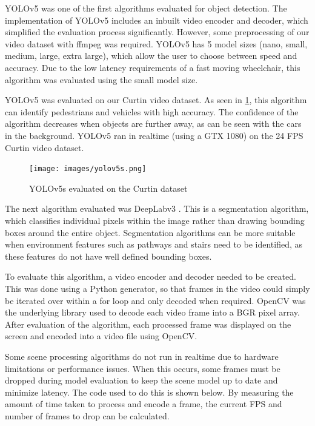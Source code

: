 \documentclass[12pt]{article}
\begin{document}
YOLOv5 \cite{ultralyticsYOLOv5} was one of the first algorithms evaluated for object detection.
The implementation of YOLOv5 includes an inbuilt video encoder and decoder, which simplified
the evaluation process significantly. However, some preprocessing of our video dataset with ffmpeg was required.
YOLOv5 has 5 model sizes (nano, small, medium, large, extra large),
which allow the user to choose between speed and accuracy.
Due to the low latency requirements of a fast moving wheelchair, this algorithm was evaluated using the small model size.

YOLOv5 was evaluated on our Curtin video dataset. As seen in \cref{fig:yolov5s}, this algorithm can identify pedestrians and vehicles with high accuracy.
The confidence of the algorithm decreases when objects are further away, as can be seen with the cars in the background.
YOLOv5 ran in realtime (using a GTX 1080) on the 24 FPS Curtin video dataset.

\begin{figure}[bp]
    \centering
    \texttt{[image: images/yolov5s.png]}
    \caption{YOLOv5s evaluated on the Curtin dataset}
    \label{fig:yolov5s}
\end{figure}

The next algorithm evaluated was DeepLabv3 \cite{chenRethinkingAtrousConvolution2017}. This is a segmentation algorithm,
which classifies individual pixels within the image rather than drawing bounding boxes around the entire object.
Segmentation algorithms can be more suitable when environment features such as pathways and stairs need to be identified,
as these features do not have well defined bounding boxes.

To evaluate this algorithm, a video encoder and decoder needed to be created. This was done using a Python generator,
so that frames in the video could simply be iterated over within a for loop and only decoded when required.
OpenCV \cite{bradskiOpenCVLibrary2000} was the underlying library used to decode each video frame into a BGR pixel array.
After evaluation of the algorithm, each processed frame was displayed on the screen and encoded into a video file using OpenCV.

Some scene processing algorithms do not run in realtime due to hardware limitations or performance issues.
When this occurs, some frames must be dropped during model evaluation to keep the scene model up to date and minimize latency.
The code used to do this is shown below. By measuring the amount of time taken to process and encode a frame, the current FPS
and number of frames to drop can be calculated.
\end{document}
